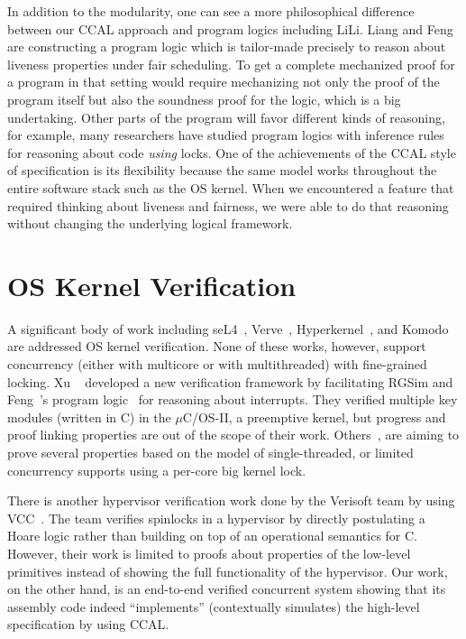 In addition to the modularity, one can see a more philosophical difference
between our CCAL approach and program logics including LiLi.  
Liang and Feng are constructing a program logic which is tailor-made
precisely to reason about liveness properties under fair
scheduling. 
To get a complete mechanized proof for a program in that
setting would require mechanizing not only the proof of the program
itself but also the soundness proof for the logic, which is a big
undertaking. 
Other parts of the program will favor different kinds of
reasoning, for example, many researchers have studied program logics
with inference rules for reasoning about code \emph{using} locks. One
of the achievements of the CCAL style of specification is its flexibility because the same model works throughout the entire software stack such as the OS kernel. When
we encountered a feature that required thinking about liveness and
fairness, we were able to do that reasoning without changing the
underlying logical framework.


\section{OS Kernel Verification} 
\label{chatper:related:sec:os-kernel-verification}

A significant body
of  work including
seL4~\cite{klein2009sel4,klein14},
Verve~\cite{hawblitzel10}, Hyperkernel~\cite{hyperkernel}, and Komodo~\cite{komodo} are 
addressed OS kernel verification.
None of these works, however, support concurrency (either with multicore or with multithreaded)  with fine-grained locking.
Xu \etal~\cite{xu16} developed a new verification framework by facilitating RGSim
and Feng~\etal's program logic~\cite{feng08:aim} for reasoning
about interrupts.
They verified multiple  key modules (written in C) 
in the $\mu$C/OS-II, a preemptive kernel,
 but progress and proof linking properties are out of the scope of their work. 
Others~\cite{klein2009sel4,hawblitzel10, hyperkernel, komodo},
are aiming to prove several properties based on the model of single-threaded, or limited concurrency supports using a per-core big kernel lock.

There is another hypervisor verification work done by the Verisoft team by using VCC~\cite{leinenbach09}.
The team verifies spinlocks in a hypervisor by directly postulating a Hoare logic rather than building
on top of an operational semantics for C.
However, their work is limited to proofs about properties of the low-level primitives 
instead of showing the full functionality of
the hypervisor.
Our work, on the other hand, 
is an end-to-end verified concurrent system showing that its
assembly code indeed ``implements'' (contextually simulates) the
high-level specification by using CCAL.



